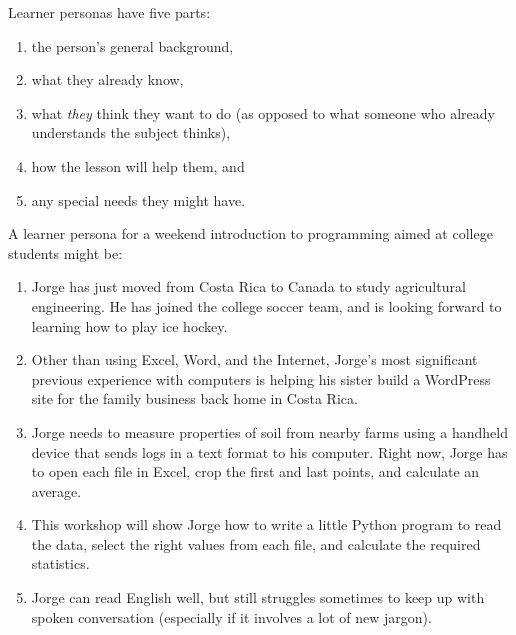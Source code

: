 \documentclass[10pt,letterpaper]{article}
\begin{document}
Learner personas have five parts:

\begin{enumerate}

\item the person's general background,

\item what they already know,

\item what \emph{they} think they want to do (as opposed to what someone who
  already understands the subject thinks),

\item how the lesson will help them, and

\item any special needs they might have.

\end{enumerate}

A learner persona for a weekend introduction to programming aimed at college
students might be:

\begin{enumerate}

\item Jorge has just moved from Costa Rica to Canada to study agricultural
  engineering. He has joined the college soccer team, and is looking forward to
  learning how to play ice hockey.

\item Other than using Excel, Word, and the Internet, Jorge's most significant
  previous experience with computers is helping his sister build a WordPress
  site for the family business back home in Costa Rica.

\item Jorge needs to measure properties of soil from nearby farms using a
  handheld device that sends logs in a text format to his computer.  Right now,
  Jorge has to open each file in Excel, crop the first and last points, and
  calculate an average.

\item This workshop will show Jorge how to write a little Python program to read
  the data, select the right values from each file, and calculate the required
  statistics.

\item Jorge can read English well, but still struggles sometimes to keep up with
  spoken conversation (especially if it involves a lot of new jargon).

\end{enumerate}
\end{document}
